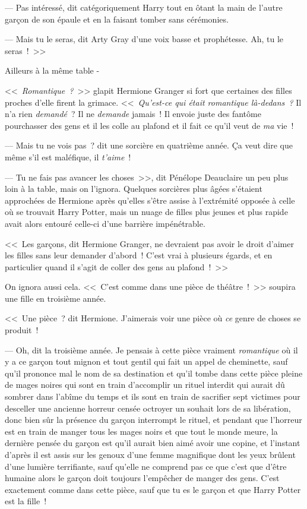 --- Pas intéressé, dit catégoriquement Harry tout en ôtant la main de l'autre garçon de son épaule et en la faisant tomber sans cérémonies.

--- Mais tu le seras, dit Arty Gray d'une voix basse et prophétesse. Ah, tu le seras~!~>>

Ailleurs à la même table -

<<~\emph{Romantique~?}~>> glapit Hermione Granger si fort que certaines des filles proches d'elle firent la grimace. <<~\emph{Qu'est-ce qui était romantique là-dedans~?} Il n'a rien \emph{demandé}~? Il ne \emph{demande} jamais~! Il envoie juste des fantôme pourchasser des gens et il les colle au plafond et il fait ce qu'il veut de \emph{ma} vie~!

--- Mais tu ne vois pas~? dit une sorcière en quatrième année. Ça veut dire que même s'il est maléfique, il \emph{t'aime}~!

--- Tu ne fais pas avancer les choses~>>, dit Pénélope Deauclaire un peu plus loin à la table, mais on l'ignora. Quelques sorcières plus âgées s'étaient approchées de Hermione après qu'elles s'être assise à l'extrémité opposée à celle où se trouvait Harry Potter, mais un nuage de filles plus jeunes et plus rapide avait alors entouré celle-ci d'une barrière impénétrable.

<<~Les garçons, dit Hermione Granger, ne devraient pas avoir le droit d'aimer les filles sans leur demander d'abord~! C'est vrai à plusieurs égards, et en particulier quand il s'agit de coller des gens au plafond~!~>>

On ignora aussi cela. <<~C'est comme dans une pièce de théâtre~!~>> soupira une fille en troisième année.

<<~Une pièce~? dit Hermione. J'aimerais voir une pièce où \emph{ce} genre de choses se produit~!

--- Oh, dit la troisième année. Je pensais à cette pièce vraiment \emph{romantique} où il y a ce garçon tout mignon et tout gentil qui fait un appel de cheminette, sauf qu'il prononce mal le nom de sa destination et qu'il tombe dans cette pièce pleine de mages noires qui sont en train d'accomplir un rituel interdit qui aurait dû sombrer dans l'abîme du temps et ils sont en train de sacrifier sept victimes pour desceller une ancienne horreur censée octroyer un souhait lors de sa libération, donc bien sûr la présence du garçon interrompt le rituel, et pendant que l'horreur est en train de manger tous les mages noirs et que tout le monde meure, la dernière pensée du garçon est qu'il aurait bien aimé avoir une copine, et l'instant d'après il est assis sur les genoux d'une femme magnifique dont les yeux brûlent d'une lumière terrifiante, sauf qu'elle ne comprend pas ce que c'est que d'être humaine alors le garçon doit toujours l'empêcher de manger des gens. C'est exactement comme dans cette pièce, sauf que tu es le garçon et que Harry Potter est la fille~!

